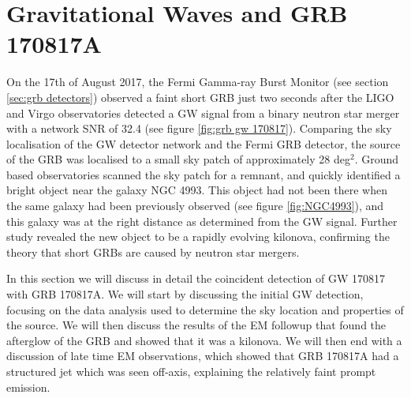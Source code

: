 \documentclass[11pt]{cuthesis}
\begin{document}
\section{Gravitational Waves and GRB 170817A} \label{sec:gw170817} 
On the 17th of August 2017, the Fermi Gamma-ray Burst Monitor (see section \ref{sec:grb detectors}) observed a faint short GRB just two seconds after the LIGO and Virgo observatories detected a GW signal from a binary neutron star merger with a network SNR of 32.4 (see figure \ref{fig:grb gw 170817})\cite{GW170817_det}. Comparing the sky localisation of the GW detector network and the Fermi GRB detector, the source of the GRB was localised to a small sky patch of approximately 28 deg$^2$. Ground based observatories scanned the sky patch for a remnant, and quickly identified a bright object near the galaxy NGC 4993\cite{GW170817_GRB}. This object had not been there when the same galaxy had been previously observed (see figure \ref{fig:NGC4993}), and this galaxy was at the right distance as determined from the GW signal. Further study revealed the new object to be a rapidly evolving kilonova, confirming the theory that short GRBs are caused by neutron star mergers. 

In this section we will discuss in detail the coincident detection of GW 170817 with GRB 170817A. We will start by discussing the initial GW detection, focusing on the data analysis used to determine the sky location and properties of the source. We will then discuss the results of the EM followup that found the afterglow of the GRB and showed that it was a kilonova. We will then end with a discussion of late time EM observations, which showed that GRB 170817A had a structured jet which was seen off-axis, explaining the relatively faint prompt emission.
\end{document}
